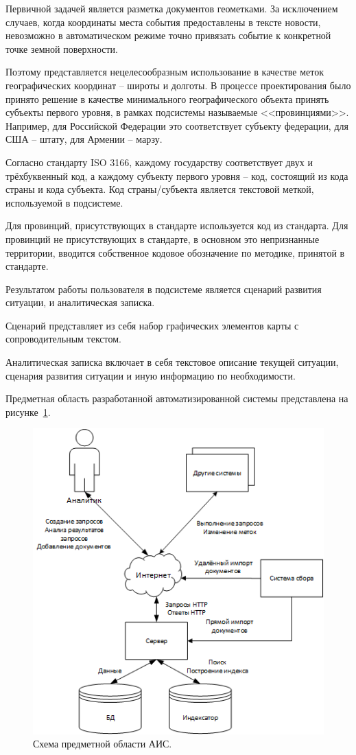 Первичной задачей является разметка документов геометками. За исключением случаев, когда координаты места события предоставлены в тексте новости, невозможно в автоматическом режиме точно привязать событие к конкретной точке земной поверхности.

Поэтому представляется нецелесообразным использование в качестве меток географических координат -- широты и долготы. В процессе проектирования было принято решение в качестве минимального географического объекта принять субъекты первого уровня, в рамках подсистемы называемые <<провинциями>>. Например, для Российской Федерации это соответствует субъекту федерации, для США -- штату, для Армении -- марзу.

Согласно стандарту ISO 3166, каждому государству соответствует двух и трёхбуквенный код, а каждому субъекту первого уровня -- код, состоящий из кода страны и кода субъекта.
Код страны/субъекта является текстовой меткой, используемой в подсистеме.

Для провинций, присутствующих в стандарте используется код из стандарта. Для провинций не присутствующих в стандарте, в основном это непризнанные территории, вводится собственное кодовое обозначение по методике, принятой в стандарте.

Результатом работы пользователя в подсистеме является сценарий развития ситуации, и аналитическая записка.

Сценарий представляет из себя набор графических элементов карты с сопроводительным текстом.

Аналитическая записка включает в себя текстовое описание текущей ситуации, сценария развития ситуации и иную информацию по необходимости.

Предметная область разработанной автоматизированной системы представлена на
рисунке~\ref{figure:domain}.

\begin{figure}[!h]
\centering
\includegraphics{design/domain}
\caption{Схема предметной области АИС.}
\label{figure:domain}
\end{figure}

